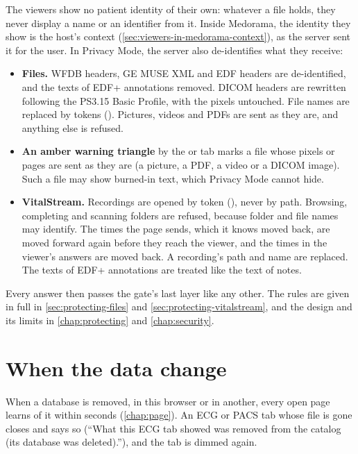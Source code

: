 \begin{phibox}
The viewers show no patient identity of their own: whatever a file holds, they never display a
name or an identifier from it. Inside Medorama, the identity they show is the host's context
(\cref{sec:viewers-in-medorama-context}), as the server sent it for the user. In Privacy Mode,
the server also de-identifies what they receive:
\begin{itemize}
\item \textbf{Files.} WFDB headers, GE MUSE XML and EDF headers are de-identified, and the texts
  of EDF+ annotations removed. DICOM headers are rewritten following the PS3.15 Basic Profile,
  with the pixels untouched. File names are replaced by tokens (). Pictures,
  videos and PDFs are sent as they are, and anything else is refused.
\item \textbf{An amber warning triangle} by the  or  tab marks a file whose
  pixels or pages are sent as they are (a picture, a PDF, a video or a DICOM image). Such a file
  may show burned-in text, which Privacy Mode cannot hide.
\item \textbf{VitalStream.} Recordings are opened by token (), never by path.
  Browsing, completing and scanning folders are refused, because folder and file names may
  identify. The times the page sends, which it knows moved back, are moved forward again before
  they reach the viewer, and the times in the viewer's answers are moved back. A recording's path
  and name are replaced. The texts of EDF+ annotations are treated like the text of notes.
\end{itemize}
Every answer then passes the gate's last layer like any other. The rules are given in full in
\cref{sec:protecting-files} and \cref{sec:protecting-vitalstream}, and the design and its limits
in \cref{chap:protecting} and \cref{chap:security}.
\end{phibox}

\section{When the data change}
\label{sec:viewers-in-medorama-changes}

When a database is removed, in this browser or in another, every open page learns of it within
seconds (\cref{chap:page}). An ECG or PACS tab whose file is gone closes and says so (``What
this ECG tab showed was removed from the catalog (its database was deleted).''), and the tab is
dimmed again.
